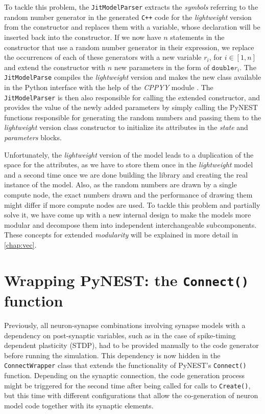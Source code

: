 To tackle this problem, the \texttt{JitModelParser} extracts the \emph{symbols} referring to the random number generator in the generated \texttt{C++} code for the \emph{lightweight} version from the constructor and replaces them with a variable, whose declaration will be inserted back into the constructor. If we now have $n$ statements in the constructor that use a random number generator in their expression, we replace the occurrences of each of these generators with a new variable $r_i$, for $i \in [1, n]$ and extend the constructor with $n$ new parameters in the form of $\texttt{double} r_i$. The \texttt{JitModelParse} compiles the \emph{lightweight} version and makes the new class available in the Python interface with the help of the \emph{CPPYY} module \citep{cppyy}. The \texttt{JitModelParser} is then also responsible for calling the extended constructor, and provides the value of the newly added parameters by simply calling the PyNEST functions responsible for generating the random numbers and passing them to the \emph{lightweight} version class constructor to initialize its attributes in the \emph{state} and \emph{parameters} blocks.

Unfortunately, the \emph{lightweight} version of the model leads to a duplication of the space for the attributes, as we have to store them once in the \emph{lightweight} model and a second time once we are done building the library and creating the real instance of the model. Also, as the random numbers are drawn by a single compute node, the exact numbers drawn and the performance of drawing them might differ if more compute nodes are used. To tackle this problem and partially solve it, we have come up with a new internal design to make the models more modular and decompose them into independent interchangeable subcomponents. These concepts for extended \emph{modularity} will be explained in more detail in \autoref{chap:vec}.

\section{Wrapping PyNEST: the \texttt{Connect()} function}

Previously, all neuron-synapse combinations involving synapse models with a dependency on post-synaptic variables, such as in the case of spike-timing dependent plasticity (STDP), had to be provided manually to the code generator before running the simulation. This dependency is now hidden in the \texttt{ConnectWrapper} class that extends the functionality of PyNEST's \texttt{Connect()} function. Depending on the synaptic connection, the code generation process might be triggered for the second time after being called for calls to \texttt{Create()}, but this time with different configurations that allow the co-generation of neuron model code together with its synaptic elements.


